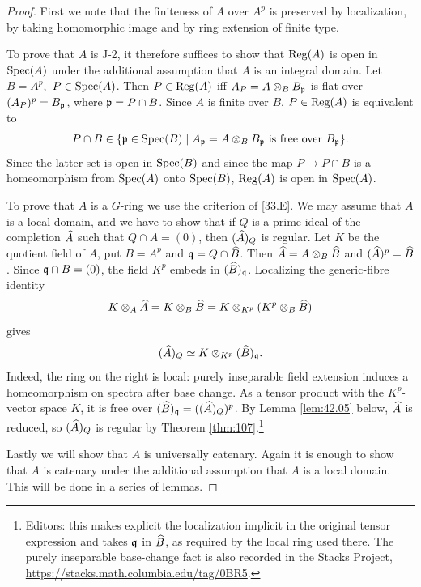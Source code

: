 \documentclass[../main]{subfiles}
\begin{document}
\begin{proof}
First we note that the finiteness of $A$ over $A^p$ is preserved by localization, by taking homomorphic image and by ring extension of finite type.

To prove that $A$ is J-2, it therefore suffices to show that $\operatorname{Reg}(A)$ is open in $\operatorname{Spec}(A)$ under the additional assumption that $A$ is an integral domain. Let $B=A^p$, $\, P \in \operatorname{Spec}(A)$. Then $P \in \operatorname{Reg}(A)$ iff $A_P=A \otimes_B B_{\mathfrak{p}}$ is flat over \newline $(A_P)^p=B_{\mathfrak{p}}$, where $\mathfrak{p}=P \cap B$. Since $A$ is finite over $B$, $P \in \operatorname{Reg}(A)$ is equivalent to \[P \cap B \in\{\mathfrak{p} \in \operatorname{Spec}(B) \mid A_{\mathfrak{p}}=A \otimes_B B_{\mathfrak{p}}\text{ is free over }B_{\mathfrak{p}}\}.\] Since the latter set is open in $\operatorname{Spec}(B)$ and since the map $P\longrightarrow P \cap B$ is a homeomorphism from $\operatorname{Spec}(A)$ onto $\operatorname{Spec}(B)$, $\operatorname{Reg}(A)$ is open in $\operatorname{Spec}(A)$.

To prove that $A$ is a $G$-ring we use the criterion of \ref{33.E}. We may assume that $A$ is a local domain, and we have to show that if $Q$ is a prime ideal of the completion $\widehat{A}$ such that $Q \cap A=(0)$, then $(\widehat{A})_Q$ is regular. Let $K$ be the quotient field of $A$, put $B=A^p$ and $\mathfrak{q}=Q\cap\widehat{B}$. Then $\widehat{A}=A \otimes_B \widehat{B}$ and $(\widehat{A})^p=\widehat{B}$. Since $\mathfrak{q}\cap B=(0)$, the field $K^p$ embeds in $(\widehat{B})_{\mathfrak{q}}$. Localizing the generic-fibre identity
\[
K\otimes_A\widehat{A}
=K\otimes_B\widehat{B}
=K\otimes_{K^p}(K^p\otimes_B\widehat{B})
\]
gives
\[
(\widehat{A})_Q \simeq K\otimes_{K^p}(\widehat{B})_{\mathfrak{q}}.
\]
Indeed, the ring on the right is local: purely inseparable field extension induces a homeomorphism on spectra after base change. As a tensor product with the $K^p$-vector space $K$, it is free over $(\widehat{B})_{\mathfrak{q}}=((\widehat{A})_Q)^p$. By Lemma \ref{lem:42.05} below, $\widehat{A}$ is reduced, so $(\widehat{A})_Q$ is regular by Theorem \ref{thm:107}.\footnote{Editors: this makes explicit the localization implicit in the original tensor expression and takes $\mathfrak{q}$ in $\widehat{B}$, as required by the local ring used there. The purely inseparable base-change fact is also recorded in the Stacks Project, \url{https://stacks.math.columbia.edu/tag/0BR5}.}

Lastly we will show that $A$ is universally catenary. Again it is enough to show that $A$ is catenary under the additional assumption that $A$ is a local domain. This will be done in a series of lemmas.
\end{proof}
\end{document}
